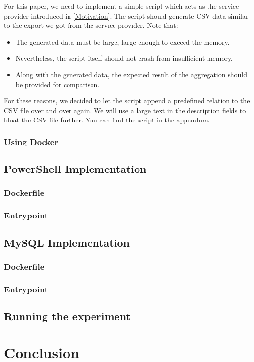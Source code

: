 For this paper, we need to implement a simple script which acts as the
service provider introduced in \ref{Motivation}. The script
should generate CSV data similar to the export we got from
the service provider. Note that:
\begin{itemize}
    \item The generated data must be large, large enough to exceed
        the memory.
    \item Nevertheless, the script itself should not crash from
        insufficient memory.
    \item Along with the generated data, the expected result of the
        aggregation should be provided for comparison.
\end{itemize}
For these reasons, we decided to let the script append a predefined
relation to the CSV file over and over again. We will use a large
text in the description fields to bloat the CSV file further.
You can find the script in the appendum.

\subsubsection{Using Docker}

\subsection{PowerShell Implementation}

\subsubsection{Dockerfile}

\subsubsection{Entrypoint}

\subsection{MySQL Implementation}

\subsubsection{Dockerfile}

\subsubsection{Entrypoint}

\subsection{Running the experiment}

\section{Conclusion}